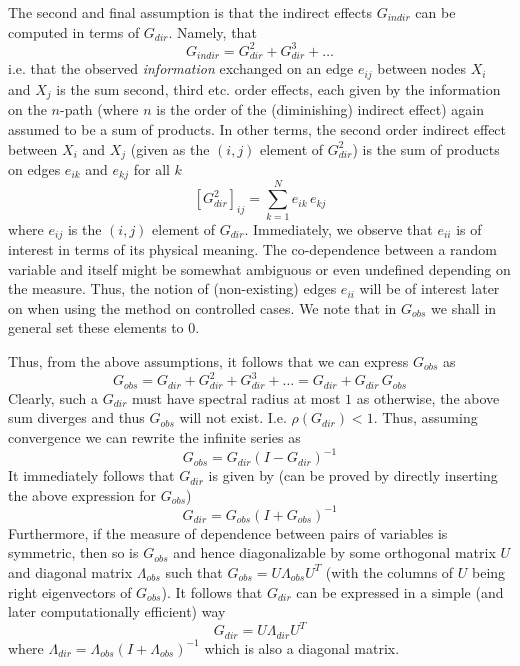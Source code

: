 \documentclass[../Thesis.tex]{subfiles}
\begin{document}
The second and final assumption is that the indirect effects $G_{indir}$ can be computed in terms of $G_{dir}$. Namely, that
\begin{equation}
    G_{indir} = G_{dir}^2 + G_{dir}^3 + \dots
\end{equation}
i.e. that the observed \textit{information} exchanged on an edge $e_{ij}$ between nodes $X_i$ and $X_j$ is the sum second, third etc. order effects, each given by the information on the $n$-path (where $n$ is the order of the (diminishing) indirect effect) again assumed to be a sum of products. In other terms, the second order indirect effect between $X_i$ and $X_j$ (given as the $(i,j)$ element of $G_{dir}^2$) is the sum of products on edges $e_{ik}$ and $e_{kj}$ for all $k$
$$\left[G_{dir}^2\right]_{ij} = \sum_{k=1}^N e_{ik}\,e_{kj}$$
where $e_{ij}$ is the $(i,j)$ element of $G_{dir}$. Immediately, we observe that $e_{ii}$ is of interest in terms of its physical meaning. The co-dependence between a random variable and itself might be somewhat ambiguous or even undefined depending on the measure. Thus, the notion of (non-existing) edges $e_{ii}$ will be of interest later on when using the method on controlled cases. We note that in $G_{obs}$ we shall in general set these elements to $0$.

Thus, from the above assumptions, it follows that we can express $G_{obs}$ as
\begin{equation}\label{eq:Network Informaiton Convolution}
    G_{obs} = G_{dir} + G_{dir}^2 + G_{dir}^3 + \dots = G_{dir} + G_{dir} \, G_{obs}
\end{equation}
Clearly, such a $G_{dir}$ must have spectral radius at most $1$ as otherwise, the above sum diverges and thus $G_{obs}$ will not exist. I.e. $\rho\left(G_{dir}\right) < 1$. Thus, assuming convergence we can rewrite the infinite series as
\begin{equation}\label{eq:Gobs from Gdir}
    G_{obs} = G_{dir} \left(I - G_{dir}\right)^{-1}
\end{equation}
It immediately follows that $G_{dir}$ is given by (can be proved by directly inserting the above expression for $G_{obs}$)
\begin{equation}\label{eq:Gdir from Gobs}
    G_{dir} = G_{obs} \left(I + G_{obs}\right)^{-1}
\end{equation}
Furthermore, if the measure of dependence between pairs of variables is symmetric, then so is $G_{obs}$ and hence diagonalizable by some orthogonal matrix $U$ and diagonal matrix $\Lambda_{obs}$ such that $G_{obs} = U \Lambda_{obs} U^T$ (with the columns of $U$ being right eigenvectors of $G_{obs}$). It follows that $G_{dir}$ can be expressed in a simple (and later computationally efficient) way
$$G_{dir} = U \Lambda_{dir} U^T$$
where $\Lambda_{dir} = \Lambda_{obs} \left(I + \Lambda_{obs}\right)^{-1}$ which is also a diagonal matrix.
\end{document}
